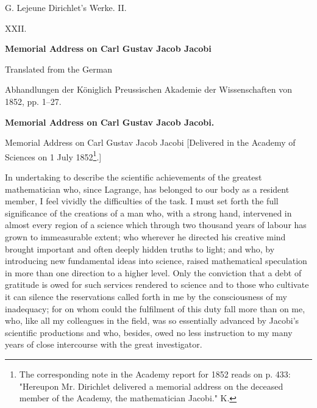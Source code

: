 \documentclass[11pt]{article}
\begin{document}
\begin{center}
{\Large G. Lejeune Dirichlet's Werke. II.}\par\vspace{1.2em}
{\Large XXII.}\par\vspace{0.5em}
{\LARGE \textbf{Memorial Address on Carl Gustav Jacob Jacobi}}\par\vspace{1em}
{\large Translated from the German}\par\vspace{0.5em}
{\small Abhandlungen der Königlich Preussischen Akademie der Wissenschaften von 1852, pp. 1--27.}
\end{center}

\bigskip
\begin{center}
{\large \textbf{Memorial Address on Carl Gustav Jacob Jacobi.}}
\end{center}

Memorial Address on Carl Gustav Jacob Jacobi
[Delivered in the Academy of Sciences on 1 July 1852\footnote{The corresponding note in the Academy report for 1852 reads on p. 433: "Hereupon Mr. Dirichlet delivered a memorial address on the deceased member of the Academy, the mathematician Jacobi." K.}.]

In undertaking to describe the scientific achievements of the greatest mathematician who, since Lagrange, has belonged to our body as a resident member, I feel vividly the difficulties of the task. I must set forth the full significance of the creations of a man who, with a strong hand, intervened in almost every region of a science which through two thousand years of labour has grown to immeasurable extent; who wherever he directed his creative mind brought important and often deeply hidden truths to light; and who, by introducing new fundamental ideas into science, raised mathematical speculation in more than one direction to a higher level. Only the conviction that a debt of gratitude is owed for such services rendered to science and to those who cultivate it can silence the reservations called forth in me by the consciousness of my inadequacy; for on whom could the fulfilment of this duty fall more than on me, who, like all my colleagues in the field, was so essentially advanced by Jacobi's scientific productions and who, besides, owed no less instruction to my many years of close intercourse with the great investigator.
\end{document}
